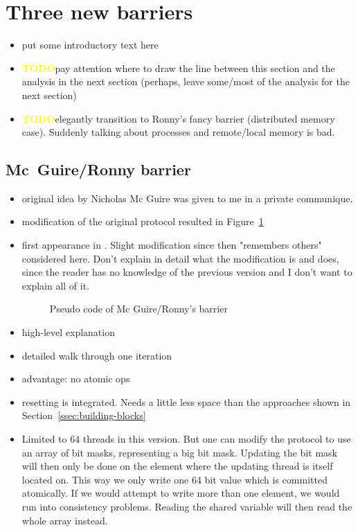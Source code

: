 \documentclass[a4paper, 10pt]{article}
\def \todo{\textbf{\textcolor{yellow}{TODO}}}
\begin{document}
\section{Three new barriers}
\label{sec:new}
\begin{itemize}
	\item put some introductory text here
	\item \todo pay attention where to draw the line between this section and the analysis in the next section (perhaps, leave some/most of the analysis for the next section)
	\item \todo elegantly transition to Ronny's fancy barrier (distributed memory case). Suddenly talking about processes and remote/local memory is bad.
\end{itemize}
\subsection{Mc~Guire/Ronny barrier}
\label{ssec:new-nmg}
\begin{itemize}
	\item original idea by Nicholas Mc Guire was given to me in a private communique.
	\item modification of the original protocol resulted in Figure~\ref{fig:pseudo-code-nmg-ronny}
	\item first appearance in \cite{bre13}. Slight modification since then "remembers others" considered here. Don't explain in detail what the modification is and does, since the reader has no knowledge of the previous version and I don't want to explain all of it.
		\begin{figure}[htbp]
			\centering
			
			\caption{Pseudo code of Mc Guire/Ronny's barrier}
			\label{fig:pseudo-code-nmg-ronny}
		\end{figure}
	\item high-level explanation
	\item detailed walk through one iteration
	\item advantage: no atomic ops
	\item resetting is integrated. Needs a little less space than the approaches shown in Section~\ref{ssec:building-blocks}
	\item Limited to 64 threads in this version. But one can modify the protocol to use an array of bit masks, representing a big bit mask. Updating the bit mask will then only be done on the element where the updating thread is itself located on. This way we only write one 64 bit value which is committed atomically. If we would attempt to write more than one element, we would run into consistency problems. Reading the shared variable will then read the whole array instead.
\end{itemize}
\end{document}
